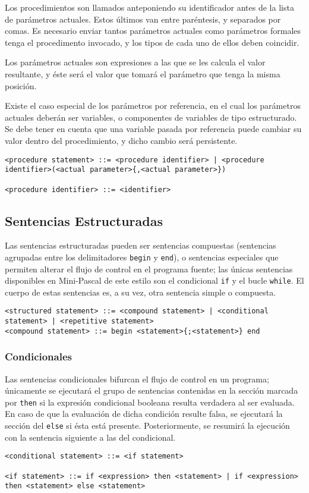 \documentclass[a4paper,oneside]{report}
\begin{document}
Los procedimientos son llamados anteponiendo su identificador antes de la lista de parámetros actuales. Estos últimos van entre paréntesis, y separados por comas. Es necesario enviar tantos parámetros actuales como parámetros formales tenga el procedimento invocado, y los tipos de cada uno de ellos deben coincidir.

Los parámetros actuales son expresiones a las que se les calcula el valor resultante, y éste será el valor que tomará el parámetro que tenga la misma posición.

Existe el caso especial de los parámetros por referencia, en el cual los parámetros actuales deberán ser variables, o componentes de variables de tipo estructurado. Se debe tener en cuenta que una variable pasada por referencia puede cambiar su valor dentro del procedimiento, y dicho cambio será persistente.


\begin{verbatim}
<procedure statement> ::= <procedure identifier> | <procedure identifier>(<actual parameter>{,<actual parameter>})

<procedure identifier> ::= <identifier>
\end{verbatim}



\subsection{Sentencias Estructuradas}

Las sentencias estructuradas pueden ser sentencias compuestas (sentencias agrupadas entre los delimitadores \texttt{begin} y \texttt{end}), o sentencias especiales que permiten alterar el flujo de control en el programa fuente; las únicas sentencias disponibles en Mini-Pascal de este estilo son el condicional \texttt{if} y el bucle \texttt{while}. El cuerpo de estas sentencias es, a su vez, otra sentencia simple o compuesta.


\begin{verbatim}
<structured statement> ::= <compound statement> | <conditional statement> | <repetitive statement>
<compound statement> ::= begin <statement>{;<statement>} end
\end{verbatim}

\subsubsection{Condicionales}
Las sentencias condicionales bifurcan el flujo de control en un programa; únicamente se ejecutará el grupo de sentencias contenidas en la sección marcada por \texttt{then} si la expresión condicional booleana resulta verdadera al ser evaluada. En caso de que la evaluación de dicha condición resulte falsa, se ejecutará la sección del \texttt{else} si ésta está presente. Posteriormente, se resumirá la ejecución con la sentencia siguiente a las del condicional.
\begin{verbatim}
<conditional statement> ::= <if statement>

<if statement> ::= if <expression> then <statement> | if <expression> then <statement> else <statement>
\end{verbatim}
\end{document}
